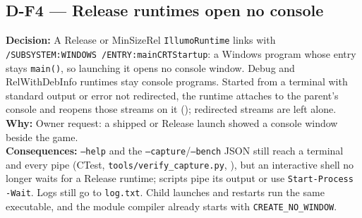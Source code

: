\subsection*{D-F4 --- Release runtimes open no console}
\begin{decisionbox}[title={D-F4 \quad 2026-10-02}]
\textbf{Decision:} A Release or MinSizeRel \texttt{IllumoRuntime} links with
\texttt{/SUBSYSTEM:WINDOWS /ENTRY:mainCRTStartup}: a Windows program whose
entry stays \texttt{main()}, so launching it opens no console window. Debug
and RelWithDebInfo runtimes stay console programs. Started from a terminal
with standard output or error not redirected, the runtime attaches to the
parent's console and reopens those streams on it
(); redirected streams
are left alone.\\
\textbf{Why:} Owner request: a shipped or Release launch showed a console
window beside the game.\\
\textbf{Consequences:} \texttt{--help} and the \texttt{--capture}/\texttt{--bench}
JSON still reach a terminal and every pipe (CTest,
\texttt{tools/verify\_capture.py}, ), but an interactive
shell no longer waits for a Release runtime; scripts pipe its output or use
\texttt{Start-Process -Wait}. Logs still go to \texttt{log.txt}. Child
launches and restarts run the same executable, and the module compiler
already starts with \texttt{CREATE\_NO\_WINDOW}.
\end{decisionbox}

